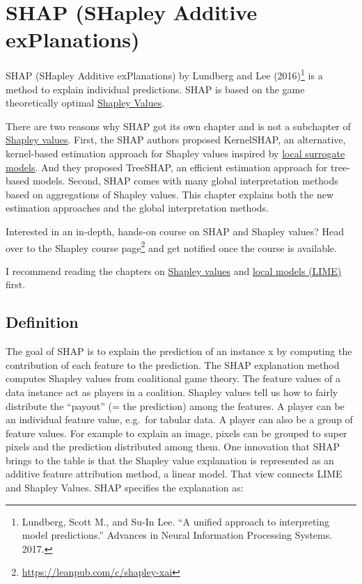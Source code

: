 \documentclass[
  12pt,
]{krantz}
\newenvironment{rmdnote}{}{}
\renewcommand{\href}[2]{#2\footnote{\url{#1}}}
\begin{document}
\newpage

\hypertarget{shap}{%
\section{SHAP (SHapley Additive exPlanations)}\label{shap}}

SHAP (SHapley Additive exPlanations) by Lundberg and Lee (2016)\footnote{Lundberg, Scott M., and Su-In Lee. ``A unified approach to interpreting model predictions.'' Advances in Neural Information Processing Systems. 2017.} is a method to explain individual predictions.
SHAP is based on the game theoretically optimal \protect\hyperlink{shapley}{Shapley Values}.

There are two reasons why SHAP got its own chapter and is not a subchapter of \protect\hyperlink{shapley}{Shapley values}.
First, the SHAP authors proposed KernelSHAP, an alternative, kernel-based estimation approach for Shapley values inspired by \protect\hyperlink{lime}{local surrogate models}.
And they proposed TreeSHAP, an efficient estimation approach for tree-based models.
Second, SHAP comes with many global interpretation methods based on aggregations of Shapley values.
This chapter explains both the new estimation approaches and the global interpretation methods.

\begin{rmdnote}
Interested in an in-depth, hands-on course on SHAP and Shapley values?
Head over to \href{https://leanpub.com/c/shapley-xai}{the Shapley course page} and get notified once the course is available.
\end{rmdnote}

I recommend reading the chapters on \protect\hyperlink{shapley}{Shapley values} and \protect\hyperlink{lime}{local models (LIME)} first.

\hypertarget{definition}{%
\subsection{Definition}\label{definition}}

The goal of SHAP is to explain the prediction of an instance x by computing the contribution of each feature to the prediction.
The SHAP explanation method computes Shapley values from coalitional game theory.
The feature values of a data instance act as players in a coalition.
Shapley values tell us how to fairly distribute the ``payout'' (= the prediction) among the features.
A player can be an individual feature value, e.g.~for tabular data.
A player can also be a group of feature values.
For example to explain an image, pixels can be grouped to super pixels and the prediction distributed among them.
One innovation that SHAP brings to the table is that the Shapley value explanation is represented as an additive feature attribution method, a linear model.
That view connects LIME and Shapley Values.
SHAP specifies the explanation as:
\end{document}
